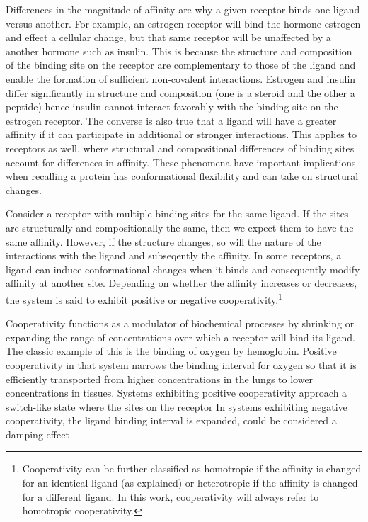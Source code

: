 \documentclass{article}
\numberwithin{equation}{section}
\begin{document}
Differences in the magnitude of affinity are why a given receptor binds one ligand versus another. For example, an estrogen receptor will bind the hormone estrogen and effect a cellular change, but that same receptor will be unaffected by a another hormone such as insulin. This is because the structure and composition of the binding site on the receptor are complementary to those of the ligand and enable the formation of sufficient non-covalent interactions. Estrogen and insulin differ significantly in structure and composition (one is a steroid and the other a peptide) hence insulin cannot interact favorably with the binding site on the estrogen receptor. The converse is also true that a ligand will have a greater affinity if it can participate in additional or stronger interactions. This applies to receptors as well, where structural and compositional differences of binding sites account for differences in affinity. These phenomena have important implications when recalling a protein has conformational flexibility and can take on structural changes.

Consider a receptor with multiple binding sites for the same ligand. If the sites are structurally and compositionally the same, then we expect them to have the same affinity. However, if the structure changes, so will the nature of the interactions with the ligand and subseqently the affinity. In some receptors, a ligand can induce conformational changes when it binds and consequently modify affinity at another site. Depending on whether the affinity increases or decreases, the system is said to exhibit positive or negative cooperativity.\footnote{Cooperativity can be further classified as homotropic if the affinity is changed for an identical ligand (as explained) or heterotropic if the affinity is changed for a different ligand. In this work, cooperativity will always refer to homotropic cooperativity.} 

Cooperativity functions as a modulator of biochemical processes by shrinking or expanding the range of concentrations over which a receptor will bind its ligand. The classic example of this is the binding of oxygen by hemoglobin. Positive cooperativity in that system narrows the binding interval for oxygen so that it is efficiently transported from higher concentrations in the lungs to lower concentrations in tissues. Systems exhibiting positive cooperativity approach a switch-like state where the sites on the receptor   In systems exhibiting negative cooperativity, the ligand binding interval is expanded, could be considered a damping effect
\end{document}
